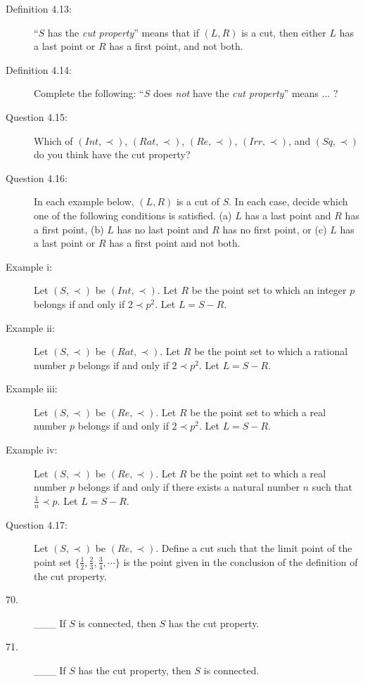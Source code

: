 \documentclass{book}
\begin{document}
\begin{description}
\item[Definition 4.13:] ``$S$ has the \emph{cut property}'' means that if $(L,R)$ is a cut, then either $L$ has a last point or $R$ has a first point, and not both.

\item[Definition 4.14:] Complete the following: ``$S$ does \emph{not} have the \emph{cut property}'' means ... ?

\item[Question 4.15:] Which of $(Int, \prec)$, $(Rat, \prec)$, $(Re, \prec)$, $(Irr, \prec)$, and $(Sq, \prec)$ do you think have the cut property?

\item[Question 4.16:] In each example below, $(L,R)$ is a cut of $S$. In each case, decide which one of the following conditions is satisfied. (a) $L$ has a last point and $R$ has a first point, (b) $L$ has no last point and $R$ has no first point, or (c) $L$ has a last point or $R$ has a first point and not both.

\item[Example i:] Let $(S, \prec)$ be $(Int, \prec)$. Let $R$ be the point set to which an integer $p$ belongs if and only if $2 \prec p^{2}$. Let $L = S - R$.

\item[Example ii:] Let $(S, \prec)$ be $(Rat, \prec)$. Let $R$ be the point set to which a rational number $p$ belongs if and only if $2 \prec p^{2}$. Let $L = S - R$.

\item[Example iii:] Let $(S, \prec)$ be $(Re, \prec)$. Let $R$ be the point set to which a real number $p$ belongs if and only if $2 \prec p^{2}$. Let $L = S - R$.

\item[Example iv:] Let $(S, \prec)$ be $(Re, \prec)$. Let $R$ be the point set to which a real number $p$ belongs if and only if there exists a natural number $n$ such that $\frac{1}{n} \prec p$. Let $L = S - R$.

\item[Question 4.17:] Let $(S, \prec)$ be $(Re, \prec)$. Define a cut such that the limit point of the point set $\{ \frac{1}{2}, \frac{2}{3}, \frac{3}{4}, \cdots \}$ is the point given in the conclusion of the definition of the cut property.

\item[70.] \_\_\_ If $S$ is connected, then $S$ has the cut property.

\item[71.] \_\_\_ If $S$ has the cut property, then $S$ is connected.


\end{description}
\end{document}
